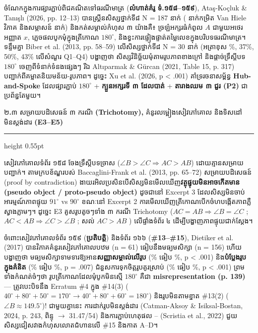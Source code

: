 \documentclass[a4paper,12pt]{article}
\newcommand{\en}[1]{{\TimesEn #1}}
\newcommand{\enbf}[1]{{\TimesEn\textbf{#1}}}
\newcommand{\cnum}[1]{{\TimesEn\fontsize{10.5pt}{12pt}\selectfont\ding{\numexpr181+#1\relax}}}
\newcommand{\ang}[1]{\ensuremath{\angle #1}}
\newcommand{\subsectitle}[1]{{\muol\fontsize{11pt}{14.5pt}\selectfont #1}}
\newcommand{\subsec}[1]{%
  \Needspace{1.6cm}%
  \vspace{2pt}%
  \subsectitle{#1}\par%
  \vspace{-2pt}%
  {\color{black}\hrule height 0.55pt}%
  \vspace{2pt}%
}
\begin{document}
ចំណែកក្នុងការផ្សារភ្ជាប់ពិជគណិតទៅធរណីមាត្រ (\textbf{លំហាត់គំរូ ទំ.១៥៨--១៥៩}), \en{Ataş-Koçluk \& Tanışlı (2026, pp. 12--13)} បានស្គ្រីនសិស្សថ្នាក់ទី៨ \en{N = 187} នាក់ (\en{24} នាក់កម្រិត \en{Van Hiele} វិភាគ និងសម្ភាសន៍ \en{6} នាក់) និងកត់សម្គាល់កំហុស ៣ យ៉ាងគឺ៖ ច្រឡំអក្សរធំកំពូល $A$ ជាមួយអថេរអញ្ញាត $x$, ភ្លេចផលបូកមុំក្នុងត្រីកោណ $180^\circ$, និងខ្វះការផ្ទៀងផ្ទាត់តម្លៃលេខក្នុងបរិបទធរណីមាត្រ។ ទន្ទឹមគ្នា \en{Biber et al. (2013, pp. 58--59)} លើសិស្សថ្នាក់ទី៨ \en{N = 30} នាក់ (អត្រាខុស \en{43\%, 37\%, 50\%, 43\%} លើសំណួរ \en{Q1--Q4}) បង្ហាញថា សិស្សវិនិច្ឆ័យមុំតាមរូបភាពខាងក្រៅ និងផ្ដាច់ទ្រឹស្ដីបទ $180^\circ$ ចេញពីទំនាក់ទំនងផ្សេងៗ រីឯ \en{Altıparmak \& Gürcan (2021, Table 15, p. 317)} បញ្ជាក់ពីគម្លាតនិយមន័យ-រូបភាព។ ដូច្នេះ \en{Xu et al. (2026, p < .001)} គាំទ្ររចនាសម្ព័ន្ធ \en{\textbf{Hub-and-Spoke}} ដែលផ្សារភ្ជាប់ $180^\circ$ + \textbf{ក្បួនអក្សរទី ៣ ដែលបាត់} + \textbf{តារាងឈម ៣ ជួរ (\en{P2})} ជាប្រព័ន្ធតែមួយ។

\subsec{២\enbf{.}៣ សម្រាយបដិសេធន៍ ៣ ករណី \enbf{(Trichotomy),} គំនូរលម្អៀងសៀវភៅគោល និងទិសដៅមិនស្ដង់ដារ \enbf{(E3--E5)}}

សៀវភៅគោលទំព័រ ១៥៨ ចែងទ្រឹស្ដីបទច្រាស ($\ang{B}>\ang{C}\Rightarrow AC>AB$) ដោយគ្មានសម្រាយបញ្ជាក់។ តាមក្របខ័ណ្ឌរបស់ \en{Baccaglini-Frank et al. (2013, pp. 65--72)} សម្រាយបដិសេធន៍ (\en{proof by contradiction}) ងាយរអិលប្រសិនបើសិស្សមិនមើលឃើញ\textbf{វត្ថុផ្ទុយមិនអាចកើតមាន (\en{pseudo object / proto-pseudo object})} ដូចជានៅ \en{Excerpt 3} ដែលសិស្សមិនចាប់អារម្មណ៍ភាពផ្ទុយ $91^\circ$ vs $90^\circ$ ខណៈនៅ \en{Excerpt 2} ការមើលឃើញត្រីកោណបើកចំហបង្កើតភាពភ្លឺស្វាងភ្លាមៗ។ ដូច្នេះ \en{E3} គូសរូបតូចៗទាំង ៣ ករណី \en{Trichotomy} ($AC=AB\Rightarrow\ang{B}=\ang{C}$ ; $AC<AB\Rightarrow\ang{C}>\ang{B}$ ; សល់ $AC>AB$ ) លើផ្ទាំងទំព័រ ៤ ដើម្បីបង្ហាញភាពផ្ទុយជាក់ស្ដែង។

ចំពោះសៀវភៅគោលទំព័រ ១៥៩ (\textbf{ប្រតិបត្តិ}) និងទំព័រ ១៦៦ (\textbf{\#13--\#15}), \en{Dietiker et al. (2017)} បានវិភាគគំនូរសៀវភៅគោលបឋម (\en{n = 61}) ធៀបនឹងមធ្យមសិក្សា (\en{n = 156}) ហើយបង្ហាញថា មធ្យមសិក្សាទាមទារឱ្យអាន\textbf{សញ្ញាសម្គាល់លើរូប} (\en{68.6\%} ធៀប \en{0\%, p < .001}) និង\textbf{បំប្លែងរូបក្នុងគំនិត} (\en{10.3\%} ធៀប \en{0\%, p = .007}) ជំនួសការទុកចិត្តរូបគូរស្រាប់ (\en{22.4\%} ធៀប \en{59.0\%, p < .001}) ព្រមទាំងកំណត់ចំៗថា រូបត្រីកោណដែលមុំបូកមិនស្មើ $180^\circ$ គឺជា \en{\textbf{misrepresentation (p. 139)}} — ត្រូវបេះបិទនឹង \en{Erratum \#4} ក្នុង \en{\#14(3)} ($40^\circ+80^\circ+50^\circ=170^\circ\to 40^\circ+80^\circ+60^\circ=180^\circ$) និងរូបមិនតាមខ្នាត \en{\#13(2)} ($\ang{B}\approx 149.5^\circ$)! ជាមួយគ្នានេះ ការដាក់រូបមិនស្ដង់ដារ (\en{Catman-Aksoy \& Isiksal-Bostan, 2024, p. 243}, ពិន្ទុ \en{16.02 $\to$ 31.47/54}) និងការភ្ជាប់ហេតុផល \cnum{1}--\cnum{5} (\en{Scristia et al., 2022}) ជួយសិស្សជៀសវាងកំហុសលោតជំហានលើ \en{\#15} និងកាត \en{A--D}។
\end{document}

